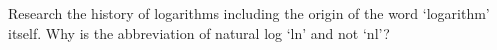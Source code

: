 {Research the history of logarithms including the origin of the word `logarithm' itself.  Why is the abbreviation of natural log `ln' and not `nl'?}